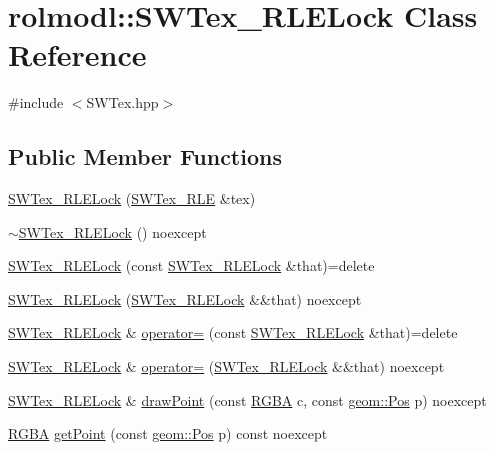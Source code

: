 \hypertarget{classrolmodl_1_1_s_w_tex___r_l_e_lock}{}\section{rolmodl\+::S\+W\+Tex\+\_\+\+R\+L\+E\+Lock Class Reference}
\label{classrolmodl_1_1_s_w_tex___r_l_e_lock}


{\ttfamily \#include $<$S\+W\+Tex.\+hpp$>$}

\subsection*{Public Member Functions}
\begin{DoxyCompactItemize}
\item 
\mbox{\hyperlink{classrolmodl_1_1_s_w_tex___r_l_e_lock_a6de44179fe9c3f0bf4b71c46b78bfe66}{S\+W\+Tex\+\_\+\+R\+L\+E\+Lock}} (\mbox{\hyperlink{classrolmodl_1_1_s_w_tex___r_l_e}{S\+W\+Tex\+\_\+\+R\+LE}} \&tex)
\item 
\mbox{\hyperlink{classrolmodl_1_1_s_w_tex___r_l_e_lock_a94b2c5bad7636a8c79295e03d0c27c32}{$\sim$\+S\+W\+Tex\+\_\+\+R\+L\+E\+Lock}} () noexcept
\item 
\mbox{\hyperlink{classrolmodl_1_1_s_w_tex___r_l_e_lock_a9d2bd5da21ba4e367db580207fb17ef6}{S\+W\+Tex\+\_\+\+R\+L\+E\+Lock}} (const \mbox{\hyperlink{classrolmodl_1_1_s_w_tex___r_l_e_lock}{S\+W\+Tex\+\_\+\+R\+L\+E\+Lock}} \&that)=delete
\item 
\mbox{\hyperlink{classrolmodl_1_1_s_w_tex___r_l_e_lock_a317e3a109db6b3c5f1cd5645b81f712e}{S\+W\+Tex\+\_\+\+R\+L\+E\+Lock}} (\mbox{\hyperlink{classrolmodl_1_1_s_w_tex___r_l_e_lock}{S\+W\+Tex\+\_\+\+R\+L\+E\+Lock}} \&\&that) noexcept
\item 
\mbox{\hyperlink{classrolmodl_1_1_s_w_tex___r_l_e_lock}{S\+W\+Tex\+\_\+\+R\+L\+E\+Lock}} \& \mbox{\hyperlink{classrolmodl_1_1_s_w_tex___r_l_e_lock_ae7f166fad857e1d3b2df83e7e4dfcaf1}{operator=}} (const \mbox{\hyperlink{classrolmodl_1_1_s_w_tex___r_l_e_lock}{S\+W\+Tex\+\_\+\+R\+L\+E\+Lock}} \&that)=delete
\item 
\mbox{\hyperlink{classrolmodl_1_1_s_w_tex___r_l_e_lock}{S\+W\+Tex\+\_\+\+R\+L\+E\+Lock}} \& \mbox{\hyperlink{classrolmodl_1_1_s_w_tex___r_l_e_lock_a9ffbe3f708e5c9ae3b8ec9684fd97614}{operator=}} (\mbox{\hyperlink{classrolmodl_1_1_s_w_tex___r_l_e_lock}{S\+W\+Tex\+\_\+\+R\+L\+E\+Lock}} \&\&that) noexcept
\item 
\mbox{\hyperlink{classrolmodl_1_1_s_w_tex___r_l_e_lock}{S\+W\+Tex\+\_\+\+R\+L\+E\+Lock}} \& \mbox{\hyperlink{classrolmodl_1_1_s_w_tex___r_l_e_lock_a053f6ca361e93a3c611bb6488fa15b6c}{draw\+Point}} (const \mbox{\hyperlink{structrolmodl_1_1_r_g_b_a}{R\+G\+BA}} c, const \mbox{\hyperlink{structrolmodl_1_1geom_1_1_pos}{geom\+::\+Pos}} p) noexcept
\item 
\mbox{\hyperlink{structrolmodl_1_1_r_g_b_a}{R\+G\+BA}} \mbox{\hyperlink{classrolmodl_1_1_s_w_tex___r_l_e_lock_aa19ad1d543ac5efa77c155bc34c01159}{get\+Point}} (const \mbox{\hyperlink{structrolmodl_1_1geom_1_1_pos}{geom\+::\+Pos}} p) const noexcept
\end{DoxyCompactItemize}
